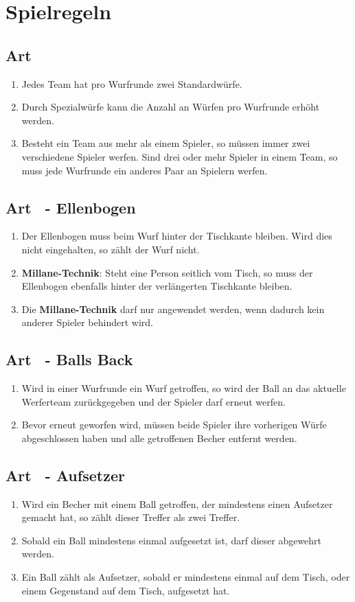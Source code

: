 \documentclass[a4paper,11pt]{scrartcl}
\newcommand{\enum}[1]{\begin{enumerate}[label=(\arabic*)]#1\end{enumerate}}
\newcommand{\art}[2]{\subsection*{#1} \enum{#2}}
\newcommand{\quot}[1]{\glqq #1\grqq}
\newcounter{art}
\begin{document}
\section{Spielregeln}
    \art{Art \theart}{
        \item
            Jedes Team hat pro Wurfrunde zwei Standardwürfe.
        \item
            Durch Spezialwürfe kann die Anzahl an Würfen pro Wurfrunde erhöht werden.
        \item
            Besteht ein Team aus mehr als einem Spieler, so müssen immer zwei verschiedene Spieler werfen. Sind drei oder mehr Spieler in einem Team, so muss jede Wurfrunde ein anderes Paar an Spielern werfen.
    }

    \art{Art \theart\ - Ellenbogen}{
        \item
            Der Ellenbogen muss beim Wurf hinter der Tischkante bleiben. Wird dies nicht eingehalten, so zählt der Wurf nicht.
        \item
            \textbf{Millane-Technik}: Steht eine Person seitlich vom Tisch, so muss der Ellenbogen ebenfalls hinter der verlängerten Tischkante bleiben.
        \item
            Die \textbf{Millane-Technik} darf nur angewendet werden, wenn dadurch kein anderer Spieler behindert wird.
    }

    \art{Art \theart\ - \quot{Balls Back}}{
        \item
            Wird in einer Wurfrunde ein Wurf getroffen, so wird der Ball an das aktuelle Werferteam zurückgegeben und der Spieler darf erneut werfen.
        \item
            Bevor erneut geworfen wird, müssen beide Spieler ihre vorherigen Würfe abgeschlossen haben und alle getroffenen Becher entfernt werden.
    }

    \art{Art \theart\ - Aufsetzer}{
        \item
            Wird ein Becher mit einem Ball getroffen, der mindestens einen Aufsetzer gemacht hat, so zählt dieser Treffer als zwei Treffer.
        \item
            Sobald ein Ball mindestens einmal aufgesetzt ist, darf dieser abgewehrt werden.
        \item
            Ein Ball zählt als Aufsetzer, sobald er mindestens einmal auf dem Tisch, oder einem Gegenstand auf dem Tisch, aufgesetzt hat.
    }
\end{document}
